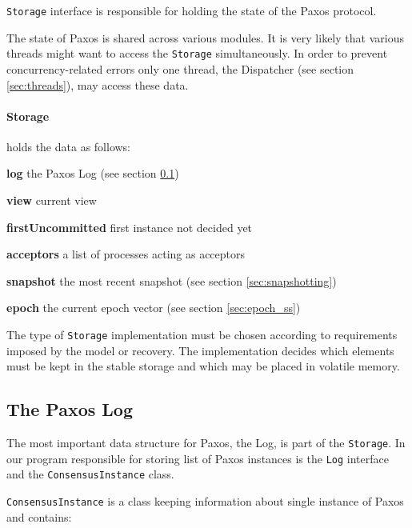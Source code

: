 \texttt{Storage} interface is responsible for holding the state of the Paxos protocol.

The state of Paxos is shared across various modules.
It is very likely that various threads might want to access the \texttt{Storage} simultaneously. In order to prevent concurrency-related errors only one thread, the Dispatcher (see section \ref{sec:threads}), may access these data. 

\paragraph{\normalfont \ttfamily Storage}
holds the data as follows:
\begin{tightList}[\setlength{\labelwidth}{0em}]
  \item[\textbf{log}] the Paxos Log (see section \ref{subsec:the_paxos_log})
  \item[\textbf{view}] current view
  \item[\textbf{firstUncommitted}] first instance not decided yet
  \item[\textbf{acceptors}] a list of processes acting as acceptors
  \item[\textbf{snapshot}] the most recent snapshot (see section \ref{sec:snapshotting})
  \item[\textbf{epoch}] the current epoch vector (see section \ref{sec:epoch_ss})
\end{tightList}

\vspace{\parsep}

The type of \texttt{Storage} implementation must be chosen according to requirements imposed by the model or recovery.
The implementation decides which elements must be kept in the stable storage and which may be placed in volatile memory.

\subsection{The Paxos Log}
\label{subsec:the_paxos_log}

The most important data structure for Paxos, the Log, is part of the \texttt{Storage}.
In our program responsible for storing list of Paxos instances is the \texttt{Log} interface and the \texttt{Con\-sen\-susInstance} class.

\texttt{ConsensusInstance} is a class keeping information about single instance of Paxos and contains:

